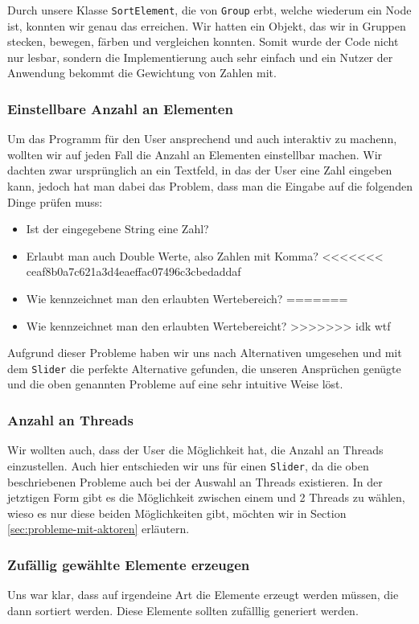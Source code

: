 Durch unsere Klasse \texttt{SortElement}, die von \texttt{Group} erbt, welche wiederum ein Node ist, konnten wir genau das erreichen. Wir hatten ein Objekt, das wir in Gruppen stecken, bewegen, färben und vergleichen konnten. Somit wurde der Code nicht nur lesbar, sondern die Implementierung auch sehr einfach und ein Nutzer der Anwendung bekommt die Gewichtung von Zahlen mit.

\subsubsection{Einstellbare Anzahl an Elementen}
Um das Programm für den User ansprechend und auch interaktiv zu machenn, wollten wir auf jeden Fall die Anzahl an Elementen einstellbar machen. Wir dachten zwar ursprünglich an ein Textfeld, in das der User eine Zahl eingeben kann, jedoch hat man dabei das Problem, dass man die Eingabe auf die folgenden Dinge prüfen muss:

\begin{itemize}
\item Ist der eingegebene String eine Zahl?
\item Erlaubt man auch Double Werte, also Zahlen mit Komma?
<<<<<<< ceaf8b0a7c621a3d4eaeffac07496c3cbedaddaf
\item Wie kennzeichnet man den erlaubten Wertebereich?
=======
\item Wie kennzeichnet man den erlaubten Wertebereicht?
>>>>>>> idk wtf
\end{itemize}

Aufgrund dieser Probleme haben wir uns nach Alternativen umgesehen und mit dem \texttt{Slider} die perfekte Alternative gefunden, die unseren Ansprüchen genügte und die oben genannten Probleme auf eine sehr intuitive Weise löst.

\subsubsection{Anzahl an Threads}
Wir wollten auch, dass der User die Möglichkeit hat, die Anzahl an Threads einzustellen. Auch hier entschieden wir uns für einen \texttt{Slider}, da die oben beschriebenen Probleme auch bei der Auswahl an Threads existieren. In der jetztigen Form gibt es die Möglichkeit zwischen einem und 2 Threads zu wählen, wieso es nur diese beiden Möglichkeiten gibt, möchten wir in Section \ref{sec:probleme-mit-aktoren} erläutern.

\subsubsection{Zufällig gewählte Elemente erzeugen}
Uns war klar, dass auf irgendeine Art die Elemente erzeugt werden müssen, die dann sortiert werden. Diese Elemente sollten zufälllig generiert werden.

